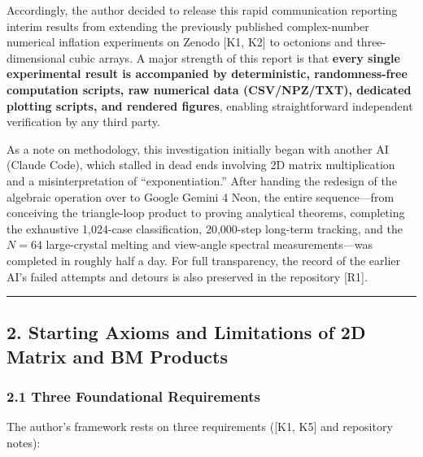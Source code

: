 \documentclass[
  a4paper,
]{article}
\begin{document}
Accordingly, the author decided to release this rapid communication
reporting interim results from extending the previously published
complex-number numerical inflation experiments on Zenodo {[}K1, K2{]} to
octonions and three-dimensional cubic arrays. A major strength of this
report is that \textbf{every single experimental result is accompanied
by deterministic, randomness-free computation scripts, raw numerical
data (CSV/NPZ/TXT), dedicated plotting scripts, and rendered figures},
enabling straightforward independent verification by any third party.

As a note on methodology, this investigation initially began with
another AI (Claude Code), which stalled in dead ends involving 2D matrix
multiplication and a misinterpretation of ``exponentiation.'' After
handing the redesign of the algebraic operation over to Google Gemini 4
Neon, the entire sequence---from conceiving the triangle-loop product to
proving analytical theorems, completing the exhaustive 1,024-case
classification, 20,000-step long-term tracking, and the \(N = 64\)
large-crystal melting and view-angle spectral measurements---was
completed in roughly half a day. For full transparency, the record of
the earlier AI's failed attempts and detours is also preserved in the
repository {[}R1{]}.

\begin{center}\rule{0.5\linewidth}{0.5pt}\end{center}

\subsection{2. Starting Axioms and Limitations of 2D Matrix and BM
Products}\label{starting-axioms-and-limitations-of-2d-matrix-and-bm-products}

\subsubsection{2.1 Three Foundational
Requirements}\label{three-foundational-requirements}

The author's framework rests on three requirements ({[}K1, K5{]} and
repository notes):
\end{document}
